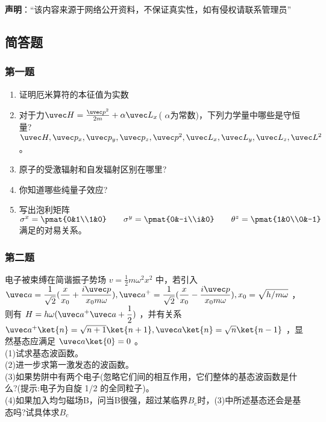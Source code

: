 


\textbf{声明}：“该内容来源于网络公开资料，不保证真实性，如有侵权请联系管理员”
\subsection{简答题}
\subsubsection{第一题}
\begin{enumerate}
\item 证明厄米算符的本征值为实数
\item 对于力$\uvec H=\frac{\uvec p^2}{2m}+\alpha \uvec L_x$( $\alpha$为常数)，下列力学量中哪些是守恒量?\\
$\uvec H,\uvec p_x,\uvec p_y,\uvec p_z,\uvec p^2,\uvec L_x,\uvec L_y,\uvec L_z,\uvec L^2$。
\item 原子的受激辐射和自发辐射区别在哪里?
\item 你知道哪些纯量子效应?
\item 写出泡利矩阵
$\sigma^x=\pmat{0&1\\1&0}\qquad \sigma^y=\pmat{0&-i\\i&0}\qquad \theta^z=\pmat{1&0\\0&-1}$满足的对易关系。
\end{enumerate}
\subsubsection{第二题}
电子被束缚在简谐振子势场 $v=\frac{1}{2}m\omega^2x^2$  中，若引入 $\displaystyle \uvec a =\frac{1}{\sqrt{2}}(\frac{x}{x_0}+\frac{i\uvec p}{x_0m\omega}),\uvec a^+ =\frac{1}{\sqrt{2}}(\frac{x}{x_0}-\frac{i\uvec p}{x_0m\omega}),x_0=\sqrt{h/m\omega}$ ，则有 $\displaystyle H=h\omega(\uvec a^+ \uvec a+\frac{1}{2})$ ，并有关系 $\uvec a^+ \ket{n}=\sqrt{n+1}\ket{n+1},\uvec a \ket{n}=\sqrt{n}\ket{n-1}$ ，显然基态应满足 $\uvec a\ket{0}=0$ 。\\
(1)试求基态波函数。\\
(2)进一步求第一激发态的波函数。\\
(3)如果势阱中有两个电子(忽略它们间的相互作用，它们整体的基态波函数是什么?(提示:电子为自旋 1/2 的全同粒子)。\\
(4)如果加入均匀磁场B，问当B很强，超过某临界$B_c$时，(3)中所述基态还会是基态吗?试具体求$B_c$
